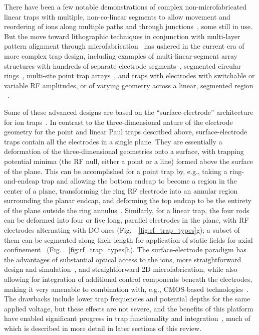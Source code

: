 \documentclass[%
12pt,
 amsmath,amssymb,
]{revtex4-2}
\begin{document}
There have been a few notable demonstrations of complex non-microfabricated linear traps with multiple, non-co-linear segments to allow movement and reordering of ions along multiple paths and through junctions~\cite{HensingerTJunction2006,blakestad_junction_2009}, some still in use.  But the move toward lithographic techniques in conjunction with multi-layer pattern alignment through microfabrication~\cite{Stick2005,NIST:SET:PRL:06} has ushered in the current era of more complex trap design, including examples of multi-linear-segment array structures with hundreds of separate electrode segments~\cite{amini_racetrack}, segmented circular rings~\cite{PhysRevApplied.4.031001}, multi-site point trap arrays~\cite{Sterling2014,BruzewiczArrayLoading2016,kumph_array,Mielenz2016}, and traps with electrodes with switchable or variable RF amplitudes, or of varying geometry across a linear, segmented region ~\cite{KimIntFiberTrap2011,kumph_array,PhysRevLett.120.023201,PhysRevA.97.020302_2018}.

Some of these advanced designs are based on the ``surface-electrode'' architecture for ion traps~\cite{NIST:SET:QIC:05}.  In contrast to the three-dimensional nature of the electrode geometry for the point and linear Paul traps described above, surface-electrode traps contain all the electrodes in a single plane.  They are essentially a deformation of the three-dimensional geometries onto a surface, with trapping potential minima (the RF null, either a point or a line) formed above the surface of the plane.  This can be accomplished for a point trap by, e.g., taking a ring-and-endcap trap and allowing the bottom endcap to become a region in the center of a plane, transforming the ring RF electrode into an annular region surrounding the planar endcap, and deforming the top endcap to be the entirety of the plane outside the ring annulus~\cite{PhysRevA.78.063410}.  Similarly, for a linear trap, the four rods can be deformed into four or five long, parallel electrodes in the plane, with RF electrodes alternating with DC ones (Fig.~~\ref{fig:rf_trap_types}g); a subset of them can be segmented along their length for application of static fields for axial confinement~\cite{NIST:SET:QIC:05} (Fig.~~\ref{fig:rf_trap_types}h).  The surface-electrode paradigm has the advantages of substantial optical access to the ions, more straightforward design and simulation~\cite{PhysRevA.78.033402,PhysRevA.78.063410,PhysRevLett.102.233002_2009,Hong2016}, and straightforward 2D microfabrication, while also allowing for integration of additional control components beneath the electrodes, making it very amenable to combination with, e.g., CMOS-based technologies~\cite{mehta_cmos_2014}.  The drawbacks include lower trap frequencies and potential depths for the same applied voltage, but these effects are not severe, and the benefits of this platform have enabled significant progress in trap functionality and integration~\cite{VanDevenderFiberTrap2010,sandia_junction_2011,KimIntFiberTrap2011,Allcock2012,oxford_muwave_trap_2013,MehtaIntegrated2016,kim_group_mirror_2016,Willitsch_group_junctions_2017,Ghadimi2017}, much of which is described in more detail in later sections of this review.
\end{document}

